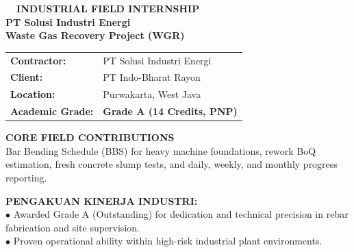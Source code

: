\documentclass[10pt,a4paper,landscape]{article}
\begin{document}
\noindent
\begin{minipage}[t]{0.30\linewidth}
  \vspace{0pt}
  \begin{tcolorbox}[sharp corners, boxrule=0.8pt, colframe=pborder, colback=white, left=3mm, right=3mm, top=2.5mm, bottom=2.5mm, height=100mm]
    \colorbox{pred}{\fontsize{7pt}{8pt}\selectfont\bfseries\color{white}\ \ INDUSTRIAL FIELD INTERNSHIP\ \ }\\[1.5mm]
    {\fontsize{9.5pt}{11.5pt}\selectfont\bfseries\color{pnavy}PT Solusi Industri Energi}\\[0.5mm]
    {\fontsize{7pt}{8.5pt}\selectfont\bfseries\color{pred}Waste Gas Recovery Project (WGR)}\\[2mm]

    \begin{tcolorbox}[sharp corners, boxrule=0.5pt, colframe=pborder, colback=pbglight, left=2mm, right=2mm, top=1.5mm, bottom=1.5mm]
      \begin{tabularx}{\linewidth}{@{}p{22mm} X@{}}
        {\fontsize{6.8pt}{8pt}\selectfont\bfseries Contractor:} & {\fontsize{6.8pt}{8pt}\selectfont PT Solusi Industri Energi} \\[0.8mm]
        {\fontsize{6.8pt}{8pt}\selectfont\bfseries Client:} & {\fontsize{6.8pt}{8pt}\selectfont PT Indo-Bharat Rayon} \\[0.8mm]
        {\fontsize{6.8pt}{8pt}\selectfont\bfseries Location:} & {\fontsize{6.8pt}{8pt}\selectfont Purwakarta, West Java} \\[0.8mm]
        {\fontsize{6.8pt}{8pt}\selectfont\bfseries Academic Grade:} & {\fontsize{6.8pt}{8pt}\selectfont\bfseries\color{pred} Grade A (14 Credits, PNP)}
      \end{tabularx}
    \end{tcolorbox}
    \vspace{1.5mm}

    {\fontsize{7.5pt}{9pt}\selectfont\bfseries\color{pnavy}CORE FIELD CONTRIBUTIONS}\\[0.8mm]
    {\fontsize{6.5pt}{8.2pt}\selectfont\color{psteel}
    Bar Bending Schedule (BBS) for heavy machine foundations, rework BoQ estimation, fresh concrete slump tests, and daily, weekly, and monthly progress reporting.
    }
  \end{tcolorbox}
  \vspace{2mm}

  \begin{tcolorbox}[sharp corners, boxrule=0.6pt, colframe=pnavy, colback=pbglight, left=2.5mm, right=2.5mm, top=2mm, bottom=2mm, height=52mm]
    {\fontsize{7pt}{8.5pt}\selectfont\bfseries\color{pnavy}PENGAKUAN KINERJA INDUSTRI:}\\[1.5mm]
    {\fontsize{6.5pt}{8.2pt}\selectfont\color{psteel}
    $\bullet$ Awarded Grade A (Outstanding) for dedication and technical precision in rebar fabrication and site supervision.\\
    $\bullet$ Proven operational ability within high-risk industrial plant environments.
    }
  \end{tcolorbox}
\end{minipage}%
\end{document}
